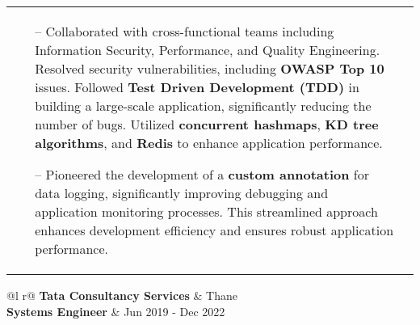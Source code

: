 \documentclass[a4paper,10.5pt]{article}
\begin{document}
\begin{tabularx}{\linewidth}{ @{}l r@{} }
{\begin{minipage}[t]{\linewidth}
\begin{itemize}[nosep,after=\strut, leftmargin=1em, itemsep=3pt]
        \item[--] Collaborated with cross-functional teams including Information Security, Performance, and Quality Engineering. Resolved security vulnerabilities, including \textbf{OWASP Top 10} issues. Followed \textbf{Test Driven Development (TDD)} in building a large-scale application, significantly reducing the number of bugs. Utilized \textbf{concurrent hashmaps}, \textbf{KD tree algorithms}, and \textbf{Redis} to enhance application performance.
        \item[--] Pioneered the development of a \textbf{custom annotation} for data logging, significantly improving debugging and application monitoring processes. This streamlined approach enhances development efficiency and ensures robust application performance.
    \end{itemize}
\end{minipage}}
\end{tabularx}

\begin{tabularx}{\linewidth}{ @{}l r@{} }
\textbf{\large{Tata Consultancy Services}} & \hfill Thane \\[3pt]
\textbf{Systems Engineer} & \hfill Jun 2019 - Dec 2022 \\[3pt]
\end{tabularx}
\end{document}
